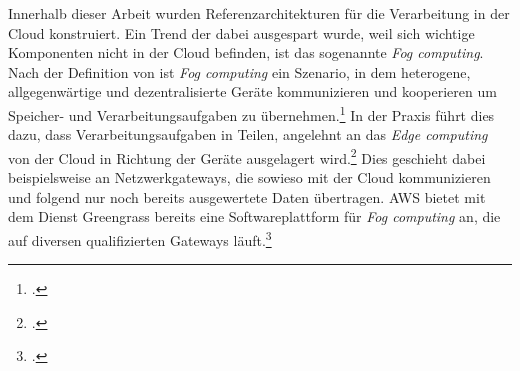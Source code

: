 Innerhalb dieser Arbeit wurden Referenzarchitekturen für die Verarbeitung in der Cloud konstruiert. Ein Trend der dabei ausgespart wurde, weil sich wichtige Komponenten nicht in der Cloud befinden, ist das sogenannte \textit{Fog computing}. Nach der Definition von \citeauthor{Vaquero.2014} ist \textit{Fog computing} ein Szenario, in dem heterogene, allgegenwärtige und dezentralisierte Geräte kommunizieren und kooperieren um Speicher- und Verarbeitungsaufgaben zu übernehmen.\footcite[Vgl.][30\psq]{Vaquero.2014} In der Praxis führt dies dazu, dass Verarbeitungsaufgaben in Teilen, angelehnt an das \textit{Edge computing} von der Cloud in Richtung der Geräte ausgelagert wird.\footcite[Vgl.][]{Bonomi.2012} Dies geschieht dabei beispielsweise an Netzwerkgateways, die sowieso mit der Cloud kommunizieren und folgend nur noch bereits ausgewertete Daten übertragen. \ac{AWS} bietet mit dem Dienst Greengrass bereits eine Softwareplattform für \textit{Fog computing} an, die auf diversen qualifizierten Gateways läuft.\footcite[Vgl. auch im Folgenden][]{AmazonWebServicesInc..o.J.bu}